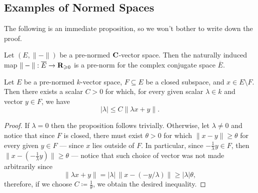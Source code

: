 \subsection{Examples of Normed Spaces}

The following is an immediate proposition, so we won't bother to write down
the proof.

\begin{lemma}
    \label{lem:prenorm-complex-conjugate-space}
    Let \((E, \| - \|)\) be a pre-normed \(\mathbf{C}\)-vector space. Then the naturally
    induced map \(\| - \|: \overline{E} \to \mathbf{R}_{\geqslant 0}\) is a pre-norm for the
    complex conjugate space \(\overline{E}\).
\end{lemma}

\begin{proposition}
    Let \(E\) be a pre-normed \(k\)-vector space, \(F \subseteq E\) be a closed
    subspace, and \(x \in E \setminus F\). Then there exists a scalar \(C > 0\)
    for which, for every given scalar \(\lambda \in k\) and vector \(y \in F\), we
    have
    \[
        |\lambda| \leq C \| \lambda x + y \|.
    \]
\end{proposition}

\begin{proof}
    If \(\lambda = 0\) then the proposition follows trivially. Otherwise, let
    \(\lambda \neq 0\) and notice that since \(F\) is closed, there must exist
    \(\theta > 0\) for which \(\| x - y \| \geq \theta\) for every given \(y \in F\)
    --- since \(x\) lies outside of \(F\). In particular, since \(-\frac{1}{\lambda}
    y \in F\), then \(\| x - (-\frac{1}{\lambda} y) \| \geq \theta\) --- notice that
    such choice of vector was not made arbitrarily since
    \[
        \| \lambda x + y \|
        = |\lambda|\, \| x - (- y / \lambda) \| \geq |\lambda| \theta,
    \]
    therefore, if we choose \(C \coloneq \frac{1}{\theta}\), we obtain the desired
    inequality.
\end{proof}

